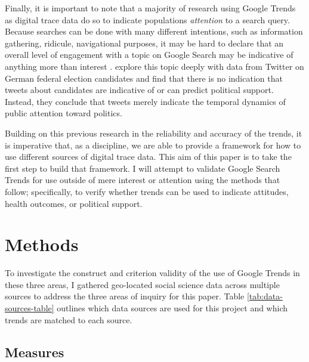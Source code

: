 Finally, it is important to note that a majority of research using 
Google Trends as digital trace data do so to indicate
populations \textit{attention} to a search query. Because
searches can be done with many different intentions, such as 
information gathering, ridicule, navigational purposes, it may
be hard to declare that an overall level of engagement with a topic
on Google Search may be indicative of anything more than interest \citep{da2011search}. 
\citet{jungherr_etal17} explore this topic deeply with data from
Twitter on German federal election candidates and find that there is no
indication that tweets about candidates are indicative of or can predict 
political support. Instead, they conclude that tweets merely indicate the
temporal dynamics of public attention toward politics. 

Building on this previous research in the reliability and accuracy of the trends, 
it is imperative that, as a discipline, we are able to provide a framework for
how to use different sources of digital trace data. This aim of this paper is
to take the first step to build that framework. I will attempt to validate 
Google Search Trends for use outside of mere interest or attention using the
methods that follow; specifically, to verify whether
trends can be used to indicate attitudes, health outcomes, or political support. 

\section{Methods}
To investigate the construct and criterion validity of the use of Google Trends
in these three areas, I gathered geo-located social science data across multiple
sources to address the three areas of inquiry for this paper.  Table
\ref{tab:data-sources-table} outlines which data sources are used for this
project and which trends are matched to each source.



\subsection{Measures}

